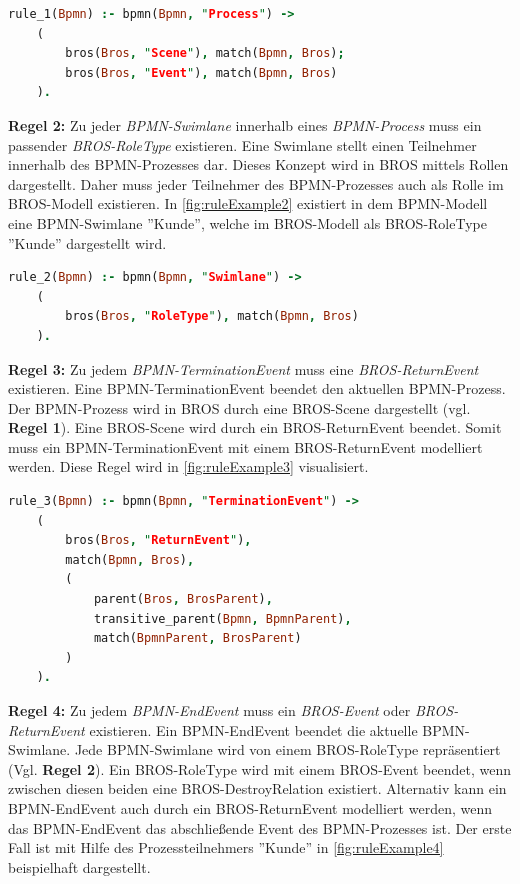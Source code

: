 \begin{lstlisting}[language=Prolog, caption=Formalisierung der Regel 1, label=lst:rule_1]
rule_1(Bpmn) :- bpmn(Bpmn, "Process") ->
    (
        bros(Bros, "Scene"), match(Bpmn, Bros);
        bros(Bros, "Event"), match(Bpmn, Bros)
    ).
\end{lstlisting}

\textbf{Regel 2:}
Zu jeder \emph{BPMN-Swimlane} innerhalb eines \emph{BPMN-Process} muss ein passender \emph{BROS-RoleType} existieren.
Eine Swimlane stellt einen Teilnehmer innerhalb des BPMN-Prozesses dar. 
Dieses Konzept wird in BROS mittels Rollen dargestellt.
Daher muss jeder Teilnehmer des BPMN-Prozesses auch als Rolle im BROS-Modell existieren.
In \cref{fig:ruleExample2} existiert in dem BPMN-Modell eine BPMN-Swimlane ''Kunde'', welche im BROS-Modell als BROS-RoleType ''Kunde'' dargestellt wird.

\begin{lstlisting}[language=Prolog, caption=Formalisierung der Regel 2, label=lst:rule_2]
rule_2(Bpmn) :- bpmn(Bpmn, "Swimlane") ->
    (
        bros(Bros, "RoleType"), match(Bpmn, Bros)
    ).
\end{lstlisting}

\textbf{Regel 3:}
Zu jedem \emph{BPMN-TerminationEvent} muss eine \emph{BROS-ReturnEvent} existieren.
Eine BPMN-TerminationEvent beendet den aktuellen BPMN-Prozess.
Der BPMN-Prozess wird in BROS durch eine BROS-Scene dargestellt (vgl. \textbf{Regel 1}).
Eine BROS-Scene wird durch ein BROS-ReturnEvent beendet.
Somit muss ein BPMN-TerminationEvent mit einem BROS-ReturnEvent modelliert werden.
Diese Regel wird in \cref{fig:ruleExample3} visualisiert.

\begin{lstlisting}[language=Prolog, caption=Formalisierung der Regel 3, label=lst:rule_3]
rule_3(Bpmn) :- bpmn(Bpmn, "TerminationEvent") ->
    (
        bros(Bros, "ReturnEvent"), 
        match(Bpmn, Bros),
        (
            parent(Bros, BrosParent),
            transitive_parent(Bpmn, BpmnParent),
            match(BpmnParent, BrosParent)
        )
    ).
\end{lstlisting}

\textbf{Regel 4:}
Zu jedem \emph{BPMN-EndEvent} muss ein \emph{BROS-Event} oder \emph{BROS-ReturnEvent} existieren.
Ein BPMN-EndEvent beendet die aktuelle BPMN-Swimlane.
Jede BPMN-Swimlane wird von einem BROS-RoleType repräsentiert (Vgl. \textbf{Regel 2}).
Ein BROS-RoleType wird mit einem BROS-Event beendet, wenn zwischen diesen beiden eine BROS-DestroyRelation existiert.
Alternativ kann ein BPMN-EndEvent auch durch ein BROS-ReturnEvent modelliert werden, wenn das BPMN-EndEvent das abschließende Event des BPMN-Prozesses ist.
Der erste Fall ist mit Hilfe des Prozessteilnehmers ''Kunde'' in \cref{fig:ruleExample4} beispielhaft dargestellt.

